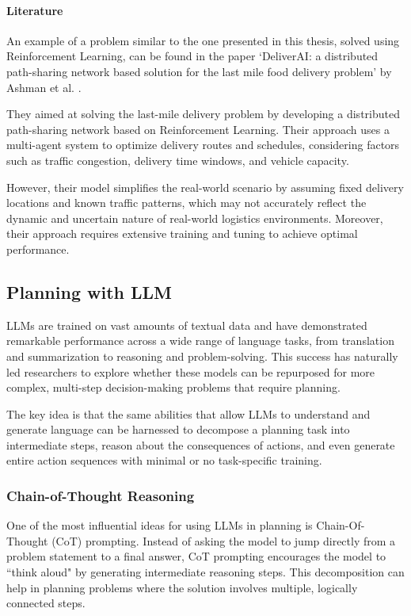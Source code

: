 \paragraph{Literature}
An example of a problem similar to the one presented in this thesis, solved using
Reinforcement Learning, can be found in the paper `DeliverAI: a distributed path-sharing
network based solution for the last mile food delivery problem' by Ashman et al.
\cite{mehra2024deliveraireinforcementlearningbased}.

They aimed at solving the last-mile delivery problem by developing a distributed
path-sharing network based on Reinforcement Learning. Their approach uses a multi-agent
system to optimize delivery routes and schedules, considering factors such as
traffic congestion, delivery time windows, and vehicle capacity.

However, their model simplifies the real-world scenario by assuming fixed delivery
locations and known traffic patterns, which may not accurately reflect the
dynamic and uncertain nature of real-world logistics environments. Moreover,
their approach requires extensive training and tuning to achieve optimal
performance.

\subsection{Planning with LLM}
\label{sub:planning_in_llm}

LLMs are trained on vast amounts of textual data and have demonstrated remarkable
performance across a wide range of language tasks, from translation and
summarization to reasoning and problem-solving. This success has naturally led researchers
to explore whether these models can be repurposed for more complex, multi-step
decision-making problems that require planning.

The key idea is that the same abilities that allow LLMs to understand and
generate language can be harnessed to decompose a planning task into
intermediate steps, reason about the consequences of actions, and even generate
entire action sequences with minimal or no task-specific training.

\subsubsection{Chain-of-Thought Reasoning}

One of the most influential ideas for using LLMs in planning is Chain-Of-Thought
(CoT) prompting. Instead of asking the model to jump directly from a problem
statement to a final answer, CoT prompting encourages the model to ``think aloud"
by generating intermediate reasoning steps. This decomposition can help in planning
problems where the solution involves multiple, logically connected steps.

